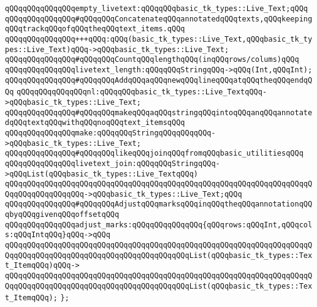 \verb|qQQqqQQqqQQqqQQqempty_livetext:qQQqqQQqbasic_tk_types::Live_Text;qQQq|\newline
\newline
\verb|qQQqqQQqqQQqqQQq#qQQqqQQqConcatenateqQQqannotatedqQQqtexts,qQQqkeepingqQQqtrackqQQqofqQQqtheqQQqtext_items.qQQq|\newline
\verb|qQQqqQQqqQQqqQQq+++qQQq:qQQq(basic_tk_types::Live_Text,qQQqbasic_tk_types::Live_Text)qQQq->qQQqbasic_tk_types::Live_Text;|\newline
\newline
\verb|qQQqqQQqqQQqqQQq#qQQqqQQqCountqQQqlengthqQQq(inqQQqrows/colums)qQQq|\newline
\verb|qQQqqQQqqQQqqQQqlivetext_length:qQQqqQQqStringqQQq->qQQq(Int,qQQqInt);|\newline
\newline
\verb|qQQqqQQqqQQqqQQq#qQQqqQQqAddqQQqaqQQqnewqQQqlineqQQqatqQQqtheqQQqendqQQq|\newline
\verb|qQQqqQQqqQQqqQQqnl:qQQqqQQqbasic_tk_types::Live_TextqQQq->qQQqbasic_tk_types::Live_Text;|\newline
\newline
\verb|qQQqqQQqqQQqqQQq#qQQqqQQqmakeqQQqaqQQqstringqQQqintoqQQqanqQQqannotatedqQQqtextqQQqwithqQQqnoqQQqtext_itemsqQQq|\newline
\verb|qQQqqQQqqQQqqQQqmake:qQQqqQQqStringqQQqqQQqqQQq->qQQqbasic_tk_types::Live_Text;|\newline
\newline
\verb|qQQqqQQqqQQqqQQq#qQQqqQQqlikeqQQqjoinqQQqfromqQQqbasic_utilitiesqQQq|\newline
\verb|qQQqqQQqqQQqqQQqlivetext_join:qQQqqQQqStringqQQq->qQQqList(qQQqbasic_tk_types::Live_TextqQQq)|\newline
\verb|qQQqqQQqqQQqqQQqqQQqqQQqqQQqqQQqqQQqqQQqqQQqqQQqqQQqqQQqqQQqqQQqqQQqqQQqqQQqqQQqqQQqqQQq->qQQqbasic_tk_types::Live_Text;qQQq|\newline
\newline
\verb|qQQqqQQqqQQqqQQq#qQQqqQQqAdjustqQQqmarksqQQqinqQQqtheqQQqannotationqQQqbyqQQqgivenqQQqoffsetqQQq|\newline
\verb|qQQqqQQqqQQqqQQqadjust_marks:qQQqqQQqqQQqqQQq{qQQqrows:qQQqInt,qQQqcols:qQQqIntqQQq}qQQq->qQQq|\newline
\verb|qQQqqQQqqQQqqQQqqQQqqQQqqQQqqQQqqQQqqQQqqQQqqQQqqQQqqQQqqQQqqQQqqQQqqQQqqQQqqQQqqQQqqQQqqQQqqQQqqQQqqQQqqQQqqQQqList(qQQqbasic_tk_types::Text_ItemqQQq)qQQq->|\newline
\verb|qQQqqQQqqQQqqQQqqQQqqQQqqQQqqQQqqQQqqQQqqQQqqQQqqQQqqQQqqQQqqQQqqQQqqQQqqQQqqQQqqQQqqQQqqQQqqQQqqQQqqQQqqQQqqQQqList(qQQqbasic_tk_types::Text_ItemqQQq);|\newline
\newline
\verb|};|\newline

